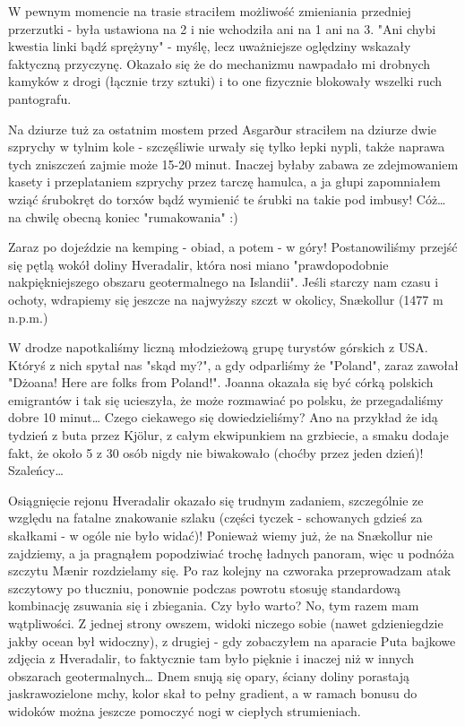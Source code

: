 W pewnym momencie na trasie straciłem możliwość zmieniania przedniej przerzutki - była ustawiona na 2 i nie wchodziła ani na 1 ani na 3. "Ani chybi kwestia linki bądź sprężyny" - myślę, lecz uważniejsze oględziny wskazały faktyczną przyczynę. Okazało się że do mechanizmu nawpadało mi drobnych kamyków z drogi (łącznie trzy sztuki) i to one fizycznie blokowały wszelki ruch pantografu.

Na dziurze tuż za ostatnim mostem przed Asgarður straciłem na dziurze dwie szprychy w tylnim kole - szczęśliwie urwały się tylko łepki nypli, także naprawa tych zniszczeń zajmie może 15-20 minut. Inaczej byłaby zabawa ze zdejmowaniem kasety i przeplataniem szprychy przez tarczę hamulca, a ja głupi zapomniałem wziąć śrubokręt do torxów bądź wymienić te śrubki na takie pod imbusy! Cóż… na chwilę obecną koniec "rumakowania" :)


Zaraz po dojeździe na kemping - obiad, a potem - w góry! Postanowiliśmy przejść się pętlą wokół doliny Hveradalir, która nosi miano "prawdopodobnie nakpiękniejszego obszaru geotermalnego na Islandii". Jeśli starczy nam czasu i ochoty, wdrapiemy się jeszcze na najwyższy szczt w okolicy, Snækollur (1477 m n.p.m.)

W drodze napotkaliśmy liczną młodzieżową grupę turystów górskich z USA. Któryś z nich spytał nas "skąd my?", a gdy odparliśmy że "Poland", zaraz zawołał "Dżoana! Here are folks from Poland!". Joanna okazała się być córką polskich emigrantów i tak się ucieszyła, że może rozmawiać po polsku, że przegadaliśmy dobre 10 minut… Czego ciekawego się dowiedzieliśmy? Ano na przykład że idą tydzień z buta przez Kjölur, z całym ekwipunkiem na grzbiecie, a smaku dodaje fakt, że około 5 z 30 osób nigdy nie biwakowało (choćby przez jeden dzień)! Szaleńcy…


Osiągnięcie rejonu Hveradalir okazało się trudnym zadaniem, szczególnie ze względu na fatalne znakowanie szlaku (części tyczek - schowanych gdzieś za skałkami - w ogóle nie było widać)! Ponieważ wiemy już, że na Snækollur nie zajdziemy, a ja pragnąłem popodziwiać trochę ładnych panoram, więc u podnóża szczytu Mænir rozdzielamy się. Po raz kolejny na czworaka przeprowadzam atak szczytowy po tłuczniu, ponownie podczas powrotu stosuję standardową kombinację zsuwania się i zbiegania. Czy było warto? No, tym razem mam wątpliwości. Z jednej strony owszem, widoki niczego sobie (nawet gdzieniegdzie jakby ocean był widoczny), z drugiej - gdy zobaczyłem na aparacie Puta bajkowe zdjęcia z Hveradalir, to faktycznie tam było pięknie i inaczej niż w innych obszarach geotermalnych… Dnem snują się opary, ściany doliny porastają jaskrawozielone mchy, kolor skał to pełny gradient, a w ramach bonusu do widoków można jeszcze pomoczyć nogi w ciepłych strumieniach.

